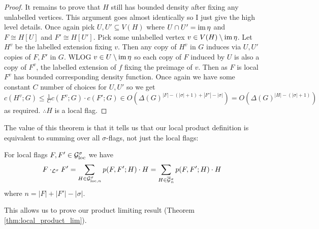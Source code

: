 \begin{proof}
    It remains to prove that $H$ still has bounded density after fixing any unlabelled vertices.
    This argument goes almost identically so I just give the high level details. Once again
    pick $U, U' \subseteq V(H)$ where $U\cap U'=\operatorname{im}\eta$ and $F\cong H[U]$ and $F' \cong H[U']$.
    Pick some unlabelled vertex $v\in V(H)\setminus \operatorname{im}\eta$.
    Let $H^v$ be the labelled extension fixing $v$. Then any copy of $H^v$ in $G$ induces
    via $U, U'$ copies of $F, F'$ in $G$. WLOG $v \in U \setminus \operatorname{im} \eta$ so each copy
    of $F$ induced by $U$ is also a copy of $F^v$, the labelled extension of $f$ fixing the
    preimage of $v$. Then as $F$ is local $F^v$ has bounded corresponding density
    function. Once again we have some constant $C$ number of choices for $U, U'$ so we
    get
    $c(H^v; G) \leq \frac{1}{C} c(F^v; G) \cdot c(F'; G) \in
    O(\Delta(G)^{|F|-(|\sigma|+1)+|F'|-|\sigma|}) = O(\Delta(G)^{|H|-(|\sigma|+1)})$
    as required.  $\therefore H$ is a local flag.
\end{proof}

The value of this theorem is that it tells us that our local product definition is
equivalent to summing over all $\sigma$-flags, not just the local flags:

\begin{corollary}
    \label{corollary:local_product}
    For local flags $F, F' \in \mathcal{G}_\mathrm{loc}^\sigma$ we have
    \[
        F \cdot_{\mathcal{L}^\sigma} F'
        = \sum_{H\in\mathcal{G}_{\mathrm{loc},n}^\sigma}p(F, F'; H)\cdot H
        = \sum_{H\in\overline{\mathcal{G}}{}_n^\sigma}p(F, F'; H)\cdot H
    \]
    where $n=|F|+|F'|-|\sigma|$.
\end{corollary}

This allows us to prove our product limiting result (Theorem \ref{thm:local_product_lim}).

